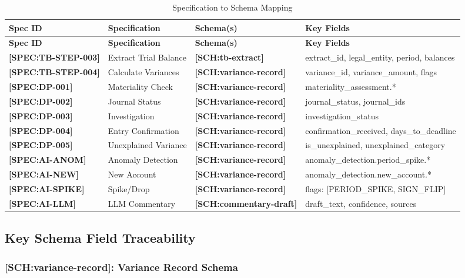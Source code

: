 \documentclass[11pt,a4paper]{article}
\newcommand{\specref}[1]{\textcolor{specblue}{\textbf{[SPEC:#1]}}}
\newcommand{\schemaref}[1]{\textcolor{schemaorg}{\textbf{[SCH:#1]}}}
\begin{document}
\begin{longtable}{@{}C{2cm}L{4cm}C{3cm}L{4.5cm}@{}}
\caption{Specification to Schema Mapping} \\
\toprule
\textbf{Spec ID} & \textbf{Specification} & \textbf{Schema(s)} & \textbf{Key Fields} \\
\midrule
\endfirsthead
\toprule
\textbf{Spec ID} & \textbf{Specification} & \textbf{Schema(s)} & \textbf{Key Fields} \\
\midrule
\endhead
\specref{TB-STEP-003} & Extract Trial Balance & \schemaref{tb-extract} & extract\_id, legal\_entity, period, balances \\
\specref{TB-STEP-004} & Calculate Variances & \schemaref{variance-record} & variance\_id, variance\_amount, flags \\
\specref{DP-001} & Materiality Check & \schemaref{variance-record} & materiality\_assessment.* \\
\specref{DP-002} & Journal Status & \schemaref{variance-record} & journal\_status, journal\_ids \\
\specref{DP-003} & Investigation & \schemaref{variance-record} & investigation\_status \\
\specref{DP-004} & Entry Confirmation & \schemaref{variance-record} & confirmation\_received, days\_to\_deadline \\
\specref{DP-005} & Unexplained Variance & \schemaref{variance-record} & is\_unexplained, unexplained\_category \\
\specref{AI-ANOM} & Anomaly Detection & \schemaref{variance-record} & anomaly\_detection.period\_spike.* \\
\specref{AI-NEW} & New Account & \schemaref{variance-record} & anomaly\_detection.new\_account.* \\
\specref{AI-SPIKE} & Spike/Drop & \schemaref{variance-record} & flags: [PERIOD\_SPIKE, SIGN\_FLIP] \\
\specref{AI-LLM} & LLM Commentary & \schemaref{commentary-draft} & draft\_text, confidence, sources \\
\bottomrule
\end{longtable}

\subsection{Key Schema Field Traceability}

\subsubsection{\schemaref{variance-record}: Variance Record Schema}
\end{document}
